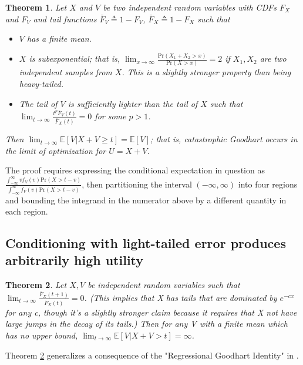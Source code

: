 \documentclass{article}
\theoremstyle{plain}
\newtheorem{theorem}{Theorem}
\theoremstyle{definition}
\theoremstyle{remark}
\begin{document}
\begin{theorem}
    \label{thm5} Let $X$ and $V$ be two independent random variables with CDFs $F_X$ and $F_V$ and tail functions $\bar F_V \triangleq 1 - F_V$, $\bar F_X \triangleq 1 - F_X$ such that
    \begin{itemize}
        \item $V$ has a finite mean.
        \item $X$ is subexponential; that is, $\lim_{x\to\infty}\frac{\text{Pr}(X_1+X_2>x)}{\text{Pr}(X>x)} = 2$ if $X_1, X_2$ are two independent samples from $X$. This is a slightly stronger property than being heavy-tailed.
        \item The tail of $V$ is sufficiently lighter than the tail of $X$ such that \(\lim_{t\to\infty}\frac{t^p\bar F_V(t)}{\bar F_X(t)} = 0\) for some \(p > 1\).
    \end{itemize}
    Then $\lim_{t \to \infty} \mathbb E[V | X + V \ge t] =\mathbb{E}[V]$; that is, catastrophic Goodhart occurs in the limit of optimization for $U=X+V$.
\end{theorem}

The proof requires expressing the conditional expectation in question as $\frac{\int_{-\infty}^\infty vf_V(v)\text{Pr}(X>t-v)} {\int_{-\infty}^\infty f_V(v)\text{Pr}(X>t-v)}$, then partitioning the interval $(-\infty, \infty)$ into four regions and bounding the integrand in the numerator above by a different quantity in each region. 



\subsection{Conditioning with light-tailed error produces arbitrarily high utility}
\begin{theorem}
    \label{thm6}
    Let $X, V$ be independent random variables such that $\lim_{t\to\infty}\frac{\bar{F}_X(t+1)}{\bar{F}_X(t)}=0$. (This implies that X has tails that are dominated by $e^{-cx}$ for any c, though it's a slightly stronger claim because it requires that X not have large jumps in the decay of its tails.)
    Then for any V with a finite mean which has no upper bound, $\lim_{t\to\infty}\mathbb{E}[V|X+V > t] = \infty$. 
\end{theorem}

Theorem \ref{thm6} generalizes a consequence of the "Regressional Goodhart Identity" in \citep{gao2023scaling}.
\end{document}
